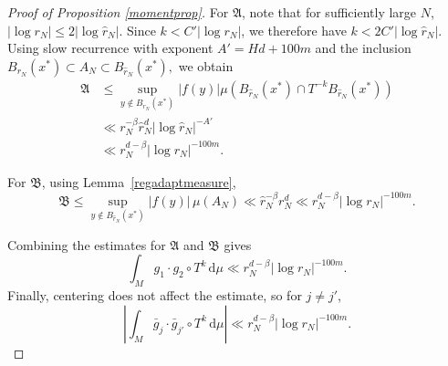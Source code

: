 \documentclass[10pt,a4paper]{amsart}
\renewcommand{\d}{\, \text{d}}
\begin{document}
\begin{proof}[Proof of Proposition \ref{momentprop}]
For $\mathfrak A$, note that for sufficiently large $N$, $|\log r_N|\leq 2|\log\hat{r}_N|$. Since $k<C'|\log r_N|$, we therefore have $k<2C'|\log\hat r_N|.$
Using slow recurrence with exponent $A'=Hd+100m$ and the inclusion $B_{r_N}(x^*)\subset A_N\subset B_{\hat r_N}(x^*),$
we obtain
\begin{align*}
\mathfrak A
&\leq
\sup_{y\notin B_{r_N}(x^*)}|f(y)|
\mu(B_{\hat{r}_N}(x^*)\cap T^{-k}B_{\hat{r}_N}(x^*))\\
&\ll
r_N^{-\beta}\hat{r}_N^d|\log\hat{r}_N|^{-A'}\\
&\ll
r_N^{d-\beta}|\log r_N|^{-100m}.
\end{align*}

For $\mathfrak B$, using Lemma~\ref{regadaptmeasure},
$$\mathfrak B\leq\sup_{y\notin B_{\hat{r}_N}(x^*)}|f(y)|\,\mu(A_N)\ll
\hat{r}_N^{-\beta}r_N^d\ll r_N^{d-\beta}|\log r_N|^{-100m}.
$$

Combining the estimates for $\mathfrak A$ and $\mathfrak B$ gives
\begin{equation*}
\int_M g_1\cdot g_2\circ T^k\d\mu
\ll
r_N^{d-\beta}|\log r_N|^{-100m}.
\end{equation*}
Finally, centering does not affect the estimate, so for $j\neq j'$,
\begin{equation*}
\left|\int_M\bar g_j\cdot\bar g_{j'}\circ T^k\d\mu\right|
\ll
r_N^{d-\beta}|\log r_N|^{-100m}.
\end{equation*}



\end{proof}
\end{document}
